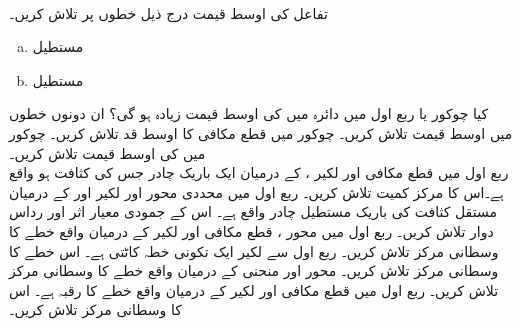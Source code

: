 \\
تفاعل  کی اوسط قیمت درج ذیل خطوں پر تلاش کریں۔
\begin{enumerate}[a.]
\item
مستطیل 
\item
مستطیل 
\end{enumerate}
کیا چوکور  یا ربع اول میں دائرہ   میں   کی اوسط قیمت زیادہ ہو گی؟ ان دونوں خطوں میں اوسط   قیمت تلاش کریں۔
چوکور  میں قطع مکافی  کا  اوسط قد تلاش کریں۔
چوکور  میں  کی اوسط قیمت تلاش کریں۔
\\
ربع اول میں قطع مکافی  اور لکیر ،  کے درمیان ایک باریک چادر جس کی کثافت  ہو  واقع  ہے۔اس کا مرکز کمیت تلاش کریں۔
ربع اول میں محددی محور اور  لکیر  اور   کے درمیان   مستقل کثافت کی باریک  مستطیل چادر واقع   ہے۔ اس کے جمودی  معیار اثر اور رداس دوار تلاش کریں۔
ربع اول میں محور ، قطع مکافی  اور لکیر  کے درمیان واقع  خطے کا وسطانی مرکز تلاش کریں۔
ربع اول سے لکیر  ایک تکونی خطہ کاٹتی ہے۔ اس خطے  کا وسطانی مرکز تلاش کریں۔
محور  اور  منحنی  کے درمیان واقع  خطے کا وسطانی مرکز تلاش کریں۔
ربع اول میں قطع مکافی   اور لکیر  کے درمیان واقع خطے کا رقبہ  ہے۔ اس کا وسطانی مرکز تلاش کریں۔
